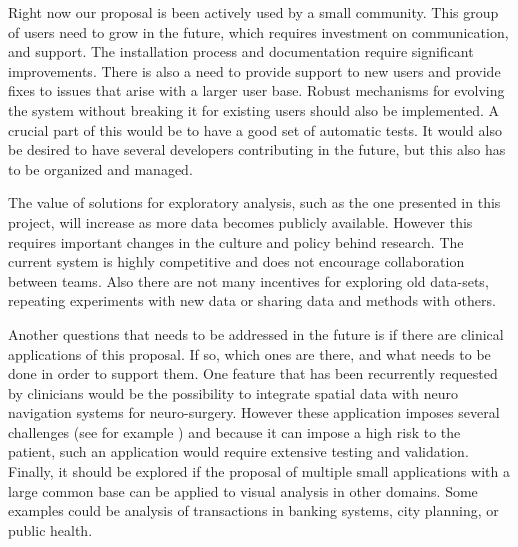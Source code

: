 Right now our proposal is been actively used by a small community. This group of users need to grow in the future, which requires investment on communication, and support. The installation process and documentation require significant improvements. There is also a need to provide support to new users and provide fixes to issues that arise with a larger user base. Robust mechanisms for evolving the system without breaking it for existing users should also be implemented. A crucial part of this would be to have a good set of automatic tests. It would also be desired to have several developers contributing in the future, but this also has to be organized and managed.

The value of solutions for exploratory analysis, such as the one presented in this project, will increase as more data becomes publicly available. However this requires important changes in the culture and policy behind research. The current system is highly competitive and does not encourage collaboration between teams. Also there are not many incentives for exploring old data-sets, repeating experiments with new data or sharing data and methods with others. 

Another questions that needs to be addressed in the future is if there are clinical applications of this proposal. If so, which ones are there, and what needs to be done in order to support them. One feature that has been recurrently requested by clinicians would be the possibility to integrate spatial data with neuro navigation systems for neuro-surgery. However these application imposes several challenges (see for example \autocite{talos_diffusion_2003}) and because it can impose a high risk to the patient, such an application would require extensive testing and validation.
Finally, it should be explored if the proposal of multiple small applications with a large common base can be applied to visual analysis in other domains. Some examples could be analysis of transactions in banking systems, city planning, or public health.  